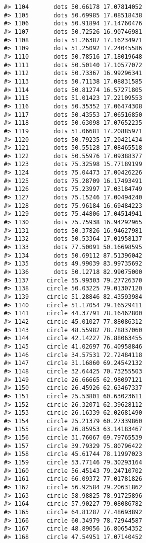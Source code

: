 \documentclass[
]{book}
\theoremstyle{definition}
\theoremstyle{definition}
\theoremstyle{definition}
\theoremstyle{definition}
\theoremstyle{remark}
\begin{document}
\begin{verbatim}
#> 1104       dots 50.66178 17.07814052
#> 1105       dots 50.69985 17.08518438
#> 1106       dots 50.91894 17.14760476
#> 1107       dots 50.72526 16.90746981
#> 1108       dots 51.26387 17.16234971
#> 1109       dots 51.25092 17.24045586
#> 1110       dots 50.78516 17.18019648
#> 1111       dots 50.50140 17.10577072
#> 1112       dots 50.73367 16.99296341
#> 1113       dots 50.71138 17.08831585
#> 1114       dots 50.81274 16.57271805
#> 1115       dots 51.01423 17.22109553
#> 1116       dots 50.35352 17.06474308
#> 1117       dots 50.43553 17.06516850
#> 1118       dots 50.63098 17.07652235
#> 1119       dots 51.06681 17.20885971
#> 1120       dots 50.79235 17.20421434
#> 1121       dots 50.55128 17.08465518
#> 1122       dots 50.55976 17.09388377
#> 1123       dots 75.32598 15.77189199
#> 1124       dots 75.04473 17.00426226
#> 1125       dots 75.28709 16.17493491
#> 1126       dots 75.23997 17.03184749
#> 1127       dots 75.15246 17.00494240
#> 1128       dots 75.96184 16.69484223
#> 1129       dots 75.44806 17.04514941
#> 1130       dots 75.75938 16.94292965
#> 1131       dots 50.37826 16.94627981
#> 1132       dots 50.53364 17.01958137
#> 1133       dots 77.50091 50.16698595
#> 1134       dots 50.69112 87.51396042
#> 1135       dots 49.99039 83.99735692
#> 1136       dots 50.12718 82.99075000
#> 1137     circle 55.99303 79.27726370
#> 1138     circle 50.03225 79.01307120
#> 1139     circle 51.28846 82.43593984
#> 1140     circle 51.17054 79.16529411
#> 1141     circle 44.37791 78.16462800
#> 1142     circle 45.01027 77.88086312
#> 1143     circle 48.55982 78.78837060
#> 1144     circle 42.14227 76.88063455
#> 1145     circle 41.02697 76.40958846
#> 1146     circle 34.57531 72.72484118
#> 1147     circle 31.16860 69.24542132
#> 1148     circle 32.64425 70.73255503
#> 1149     circle 26.66665 62.98097121
#> 1150     circle 26.45926 62.63467337
#> 1151     circle 25.53801 60.63023611
#> 1152     circle 26.32071 62.39628112
#> 1153     circle 26.16339 62.02681490
#> 1154     circle 25.21379 60.27339860
#> 1155     circle 26.85953 63.14183467
#> 1156     circle 31.76067 69.79765539
#> 1157     circle 39.79329 75.80796422
#> 1158     circle 45.61744 78.11997023
#> 1159     circle 53.77146 79.30293164
#> 1160     circle 56.45143 79.24710702
#> 1161     circle 66.09372 77.01781826
#> 1162     circle 56.92584 79.20631862
#> 1163     circle 58.98825 78.91725896
#> 1164     circle 57.90227 79.08086782
#> 1165     circle 64.81287 77.48693892
#> 1166     circle 60.34979 78.72944587
#> 1167     circle 48.89056 16.80654352
#> 1168     circle 47.54951 17.07140452

\end{verbatim}
\end{document}
